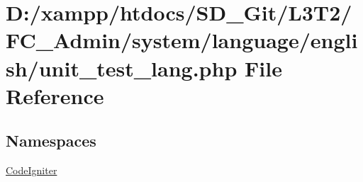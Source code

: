 \hypertarget{_admin_2system_2language_2english_2unit__test__lang_8php}{}\section{D\+:/xampp/htdocs/\+S\+D\+\_\+\+Git/\+L3\+T2/\+F\+C\+\_\+\+Admin/system/language/english/unit\+\_\+test\+\_\+lang.php File Reference}
\label{_admin_2system_2language_2english_2unit__test__lang_8php}
\subsection*{Namespaces}
\begin{DoxyCompactItemize}
\item 
 \hyperlink{namespace_code_igniter}{Code\+Igniter}
\end{DoxyCompactItemize}
